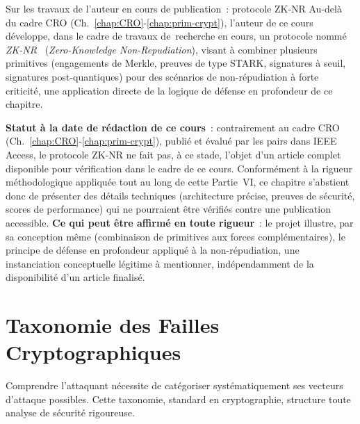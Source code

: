 \begin{boiteRemarque}{Sur les travaux de l'auteur en cours de
publication~: protocole ZK-NR}
Au-delà du cadre CRO (Ch.~\ref{chap:CRO}-\ref{chap:prim-crypt}),
l'auteur de ce cours développe, dans le cadre de travaux
de~recherche en cours, un protocole nommé \textit{ZK-NR}~\cite{minka2025zknr}
(\textit{Zero-Knowledge Non-Repudiation}), visant à combiner
plusieurs primitives (engagements de Merkle, preuves de type
STARK, signatures à seuil, signatures post-quantiques) pour des
scénarios de non-répudiation à forte criticité, une application
directe de la logique de défense en profondeur de ce chapitre.

\textbf{Statut à la date de rédaction de ce cours}~: contrairement
au cadre CRO (Ch.~\ref{chap:CRO}-\ref{chap:prim-crypt}), publié et
évalué par les pairs dans IEEE Access, le protocole ZK-NR ne fait
pas, à ce stade, l'objet d'un article complet disponible pour
vérification dans le cadre de ce cours. Conformément à la rigueur
méthodologique appliquée tout au long de cette Partie~VI, ce
chapitre s'abstient donc de présenter des détails techniques
(architecture précise, preuves de sécurité, scores de performance)
qui ne pourraient être vérifiés contre une publication accessible.
\textbf{Ce qui peut être affirmé en toute rigueur}~: le projet
illustre, par sa conception même (combinaison de primitives aux
forces complémentaires), le principe de défense en profondeur
appliqué à la non-répudiation, une instanciation conceptuelle
légitime à mentionner, indépendamment de la disponibilité d'un
article finalisé.
\end{boiteRemarque}

\section{Taxonomie des Failles Cryptographiques}
\label{sec:taxonomie-failles}

Comprendre l'attaquant nécessite de catégoriser systématiquement
ses vecteurs d'attaque possibles. Cette taxonomie, standard en
cryptographie, structure toute analyse de sécurité rigoureuse.

